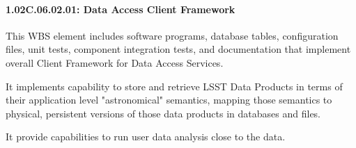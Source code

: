 \paragraph{1.02C.06.02.01: Data Access Client Framework}

This WBS element includes software programs, database tables, configuration files, unit tests, component integration tests, and documentation that implement overall Client Framework for Data Access Services.
 
It implements capability to store and retrieve LSST Data Products in terms of their application level "astronomical" semantics, mapping those semantics to physical, persistent versions of those data products in databases and files.
 
It provide capabilities to run user data analysis close to the data.
